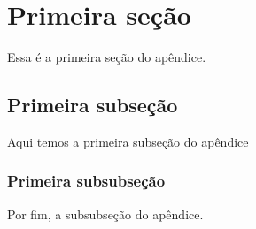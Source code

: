 \section{Primeira seção}

Essa é a primeira seção do apêndice.

\subsection{Primeira subseção}

Aqui temos a primeira subseção do apêndice

\subsubsection{Primeira subsubseção}

Por fim, a subsubseção do apêndice.
